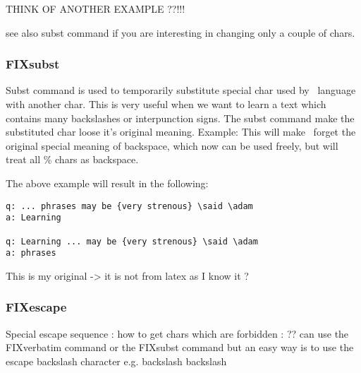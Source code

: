 \documentclass[a4paper,11pt]{article}
\newcommand{\probe}{\emph{\sc{probe{}}}}
\begin{document}
THINK OF ANOTHER EXAMPLE ??!!!

see also subst command if you are interesting in changing only a couple of
chars.




\subsubsection{FIXsubst}
Subst command is used to temporarily substitute special char used by \probe\
language with another char. This is very useful when we want to learn a
text which contains many backslashes or interpunction signs.
The subst command make the substituted char loose it's original meaning.
Example:
This will make \probe\ forget the original special meaning of backspace, which
now can be used freely, but will treat all \% chars as backspace.

The above example will result in the following:
\begin{verbatim}
q: ... phrases may be {very strenous} \said \adam
a: Learning

q: Learning ... may be {very strenous} \said \adam
a: phrases

\end{verbatim}




This is my original -> it is not from latex as I know it ?


\subsubsection{FIXescape}
Special escape sequence :
how to get chars which are forbidden : ??
can use the FIXverbatim command or the FIXsubst command but an easy way is to
use the escape backslash character e.g. backslash backslash

\end{document}
